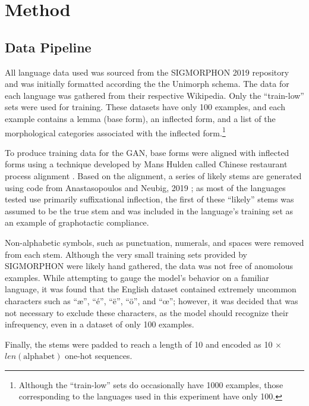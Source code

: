 \documentclass{article}
\begin{document}
  \section{Method}
    \subsection{Data Pipeline}
      All language data used was sourced from the SIGMORPHON 2019 repository and was initially formatted according the the Unimorph schema. The data for each language was gathered from their respective Wikipedia. Only the ``train-low'' sets were used for training. These datasets have only 100 examples, and each example contains a lemma (base form), an inflected form, and a list of the morphological categories associated with the inflected form.\footnote{Although the ``train-low'' sets do occasionally have 1000 examples, those corresponding to the languages used in this experiment have only 100.} 
    
      To produce training data for the GAN, base forms were aligned with inflected forms using a technique developed by Mans Hulden called Chinese restaurant process alignment \cite{crpalign}. Based on the alignment, a series of likely stems are generated using code from Anastasopoulos and Neubig, 2019 \cite{CMU}; as most of the languages tested use primarily suffixational inflection, the first of these ``likely'' stems was assumed to be the true stem and was included in the language's training set as an example of graphotactic compliance.

      Non-alphabetic symbols, such as punctuation, numerals, and spaces were removed from each stem. Although the very small training sets provided by SIGMORPHON were likely hand gathered, the data was not free of anomolous examples. While attempting to gauge the model's behavior on a familiar language, it was found that the English dataset contained extremely uncommon characters such as ``æ'', ``é'', ``ë'', ``ö'', and ``œ''; however, it was decided that was not necessary to exclude these characters, as the model should recognize their infrequency, even in a dataset of only 100 examples.

      Finally, the stems were padded to reach a length of 10 and encoded as 10 $\times$ $len(\textrm{alphabet})$ one-hot sequences.
\end{document}
